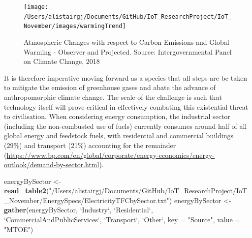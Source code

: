 \documentclass[11pt,]{article}
\newenvironment{Shaded}{\begin{snugshade}}{\end{snugshade}}
\newcommand{\DataTypeTok}[1]{\textcolor[rgb]{0.00,0.34,0.68}{#1}}
\newcommand{\KeywordTok}[1]{\textcolor[rgb]{0.12,0.11,0.11}{\textbf{#1}}}
\newcommand{\NormalTok}[1]{\textcolor[rgb]{0.12,0.11,0.11}{#1}}
\newcommand{\StringTok}[1]{\textcolor[rgb]{0.75,0.01,0.01}{#1}}
\begin{document}
\begin{figure}[H]

{\centering \texttt{[image: /Users/alistairgj/Documents/GitHub/IoT\_ResearchProject/IoT\_November/images/warmingTrend]} 

}

\caption{Atmospheric Changes with respect to Carbon Emissions and Global Warming - Observer and Projected. Source: Intergovernmental Panel on Climate Change, 2018}\label{fig:warmingTrend}
\end{figure}

It is therefore imperative moving forward as a species that all steps
are be taken to mitigate the emission of greenhouse gases and abate the
advance of anthropomorphic climate change. The scale of the challenge is
such that technology itself will prove critical in effectively combating
this existential threat to civilisation. When considering energy
consumption, the industrial sector (including the non-combusted use of
fuels) currently consumes around half of all global energy and feedstock
fuels, with residential and commercial buildings (29\%) and transport
(21\%) accounting for the remainder
(\url{https://www.bp.com/en/global/corporate/energy-economics/energy-outlook/demand-by-sector.html}).

\begin{Shaded}
\begin{Highlighting}[]
\NormalTok{energyBySector <-}\StringTok{ }\KeywordTok{read_table2}\NormalTok{(}\StringTok{"/Users/alistairgj/Documents/GitHub/IoT_ResearchProject/IoT_November/EnergySpecs/ElectricityTFCbySector.txt"}\NormalTok{)}
\NormalTok{energyBySector <-}\StringTok{ }\KeywordTok{gather}\NormalTok{(energyBySector, }\StringTok{`}\DataTypeTok{Industry}\StringTok{`}\NormalTok{, }\StringTok{`}\DataTypeTok{Residential}\StringTok{`}\NormalTok{, }\StringTok{`}\DataTypeTok{CommercialAndPublicServices}\StringTok{`}\NormalTok{, }
               \StringTok{`}\DataTypeTok{Transport}\StringTok{`}\NormalTok{, }\StringTok{`}\DataTypeTok{Other}\StringTok{`}\NormalTok{, }\DataTypeTok{key =} \StringTok{"Source"}\NormalTok{, }\DataTypeTok{value =} \StringTok{"MTOE"}\NormalTok{)}
\end{Highlighting}
\end{Shaded}
\end{document}
